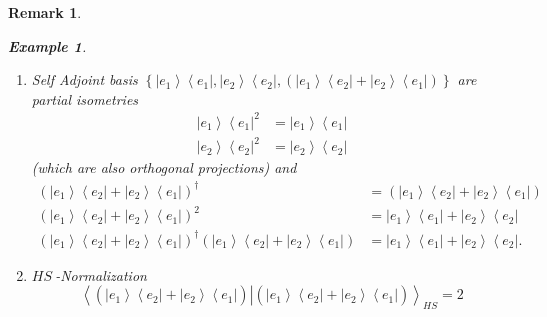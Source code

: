 \documentclass[aps,preprint]{revtex4}%
\newtheorem{example}[theorem]{Example}
\newtheorem{remark}[theorem]{Remark}
\begin{document}
\begin{remark}
\begin{enumerate}
\begin{example}
\begin{enumerate}
\item Self Adjoint basis $\left\{  \left\vert e_{1}\right\rangle \left\langle
e_{1}\right\vert ,\left\vert e_{2}\right\rangle \left\langle e_{2}\right\vert
,\left(  \left\vert e_{1}\right\rangle \left\langle e_{2}\right\vert
+\left\vert e_{2}\right\rangle \left\langle e_{1}\right\vert \right)
\right\}  $ are partial isometries
\begin{align}
\left\vert e_{1}\right\rangle \left\langle e_{1}\right\vert ^{2}  &
=\left\vert e_{1}\right\rangle \left\langle e_{1}\right\vert \\
\left\vert e_{2}\right\rangle \left\langle e_{2}\right\vert ^{2}  &
=\left\vert e_{2}\right\rangle \left\langle e_{2}\right\vert
\end{align}
(which are also orthogonal projections) and%
\begin{align}
\left(  \left\vert e_{1}\right\rangle \left\langle e_{2}\right\vert
+\left\vert e_{2}\right\rangle \left\langle e_{1}\right\vert \right)
^{\dagger}  &  =\left(  \left\vert e_{1}\right\rangle \left\langle
e_{2}\right\vert +\left\vert e_{2}\right\rangle \left\langle e_{1}\right\vert
\right) \\
\left(  \left\vert e_{1}\right\rangle \left\langle e_{2}\right\vert
+\left\vert e_{2}\right\rangle \left\langle e_{1}\right\vert \right)  ^{2}  &
=\left\vert e_{1}\right\rangle \left\langle e_{1}\right\vert +\left\vert
e_{2}\right\rangle \left\langle e_{2}\right\vert \\
\left(  \left\vert e_{1}\right\rangle \left\langle e_{2}\right\vert
+\left\vert e_{2}\right\rangle \left\langle e_{1}\right\vert \right)
^{\dagger}\left(  \left\vert e_{1}\right\rangle \left\langle e_{2}\right\vert
+\left\vert e_{2}\right\rangle \left\langle e_{1}\right\vert \right)   &
=\left\vert e_{1}\right\rangle \left\langle e_{1}\right\vert +\left\vert
e_{2}\right\rangle \left\langle e_{2}\right\vert .
\end{align}


\item $HS\ $-Normalization%
\begin{equation}
\left\langle \left.  \left(  \overset{}{\left\vert e_{1}\right\rangle
\left\langle e_{2}\right\vert +\left\vert e_{2}\right\rangle \left\langle
e_{1}\right\vert }\right)  \right\vert \left(  \overset{}{\left\vert
e_{1}\right\rangle \left\langle e_{2}\right\vert +\left\vert e_{2}%
\right\rangle \left\langle e_{1}\right\vert }\right)  \right\rangle _{HS}=2
\end{equation}



\end{enumerate}
\end{example}
\end{enumerate}
\end{remark}
\end{document}

